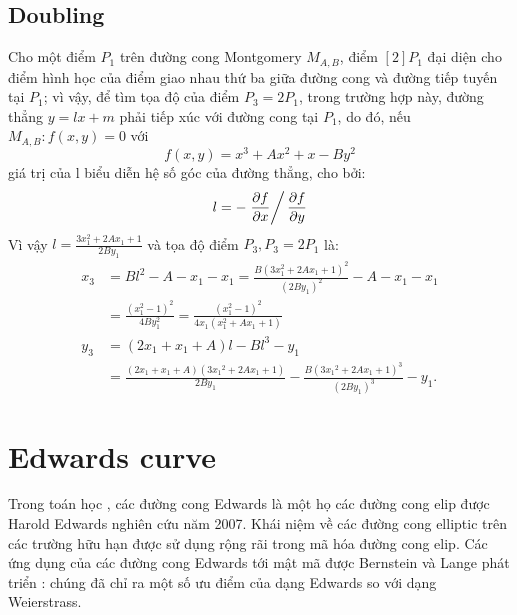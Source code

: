 \documentclass[a4paper,12pt]{report}
\begin{document}
\subsection*{Doubling}
Cho một điểm $P_{1}$ trên đường cong Montgomery $M_{A, B}$, điểm $[2]P_1$ đại diện cho điểm hình học của điểm giao nhau thứ ba giữa đường cong và đường tiếp tuyến tại $P_{1}$; vì vậy, để tìm tọa độ của điểm $P_3 = 2P_1$, trong trường hợp này, đường thẳng $y  =  lx  +  m$ phải tiếp xúc với đường cong tại $P_{1}$, do đó, nếu $M_{A, B}: f(x, y) = 0$ với
\begin{displaymath}
f(x, y) = x^3 + Ax^2 + x - By^2
\end{displaymath}
giá trị của l biểu diễn hệ số góc của đường thẳng, cho bởi:
\begin{displaymath}
 l=-\left.\frac{\partial f}{\partial x}\right/\frac{\partial f}{\partial y}
\end{displaymath}
Vì vậy $\displaystyle l = \frac{3x_1^2 + 2Ax_1 + 1}{2By_1}$ và tọa độ điểm $P_3,P_3 = 2P_1$ là:
\begin{displaymath}
{\displaystyle {\begin{aligned}x_{3}&=Bl^{2}-A-x_{1}-x_{1}={\frac {B(3x_{1}^{2}+2Ax_{1}+1)^{2}}{(2By_{1})^{2}}}-A-x_{1}-x_{1}\\&={\frac {(x_{1}^{2}-1)^{2}}{4By_{1}^{2}}}={\frac {(x_{1}^{2}-1)^{2}}{4x_{1}(x_{1}^{2}+Ax_{1}+1)}}\\[8pt]y_{3}&=(2x_{1}+x_{1}+A)l-Bl^{3}-y_{1}\\&={\frac {(2x_{1}+x_{1}+A)(3{x_{1}}^{2}+2Ax_{1}+1)}{2By_{1}}}-{\frac {B(3{x_{1}}^{2}+2Ax_{1}+1)^{3}}{(2By_{1})^{3}}}-y_{1}.\end{aligned}}}
\end{displaymath}
\section{Edwards curve}
Trong toán học , các đường cong Edwards là một họ các đường cong elip được Harold Edwards nghiên cứu năm 2007. Khái niệm về các đường cong elliptic trên các trường hữu hạn được sử dụng rộng rãi trong mã hóa đường cong elip. Các ứng dụng của các đường cong Edwards tới mật mã được Bernstein và Lange phát triển : chúng đã chỉ ra một số ưu điểm của dạng Edwards so với dạng Weierstrass.
\end{document}
